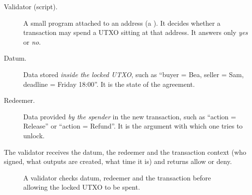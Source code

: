 \begin{description}
  \item[Validator (script).] A small program attached to an address (a ). It decides whether a transaction may spend a UTXO sitting at that address. It answers only \emph{yes} or \emph{no}.
  \item[Datum.] Data stored \emph{inside the locked UTXO}, such as ``buyer = Bea, seller = Sam, deadline = Friday 18:00''. It is the state of the agreement.
  \item[Redeemer.] Data provided \emph{by the spender} in the new transaction, such as ``action = Release'' or ``action = Refund''. It is the argument with which one tries to unlock.
\end{description}

The validator receives the datum, the redeemer and the transaction context (who signed, what outputs are created, what time it is) and returns allow or deny.

\begin{figure}[h]
\centering
{}
\caption{A validator checks datum, redeemer and the transaction before allowing the locked UTXO to be spent.}
\end{figure}

